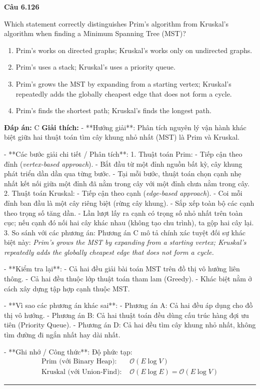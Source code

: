\documentclass[11pt,a4paper]{article}
\newenvironment{question}[1]{%
  \par\vspace{1em}\noindent\textbf{\large Câu #1}\par\vspace{0.4em}
}{%
  \par\vspace{1em}\hrule\vspace{0.6em}
}
\newenvironment{choices}{%
  \begin{enumerate}[label=\textbf{\Alph*.},leftmargin=2.2em,itemsep=2pt,topsep=3pt]
}{%
  \end{enumerate}
}
\newcommand{\choice}{\item}
\begin{document}
\begin{question}{6.126}
Which statement correctly distinguishes Prim's algorithm from Kruskal's algorithm when finding a Minimum Spanning Tree (MST)?
\begin{choices}
\choice Prim's works on directed graphs; Kruskal's works only on undirected graphs.
\choice Prim's uses a stack; Kruskal's uses a priority queue.
\choice Prim's grows the MST by expanding from a starting vertex; Kruskal's repeatedly adds the globally cheapest edge that does not form a cycle.
\choice Prim's finds the shortest path; Kruskal's finds the longest path.
\end{choices}
\textbf{Đáp án:} C
\textbf{Giải thích:} - **Hướng giải**:
Phân tích nguyên lý vận hành khác biệt giữa hai thuật toán tìm cây khung nhỏ nhất (MST) là Prim và Kruskal.


- **Các bước giải chi tiết / Phân tích**:
1. Thuật toán Prim:
   - Tiếp cận theo đỉnh (\textit{vertex-based approach}).
   - Bắt đầu từ một đỉnh nguồn bất kỳ, cây khung phát triển dần dần qua từng bước.
   - Tại mỗi bước, thuật toán chọn cạnh nhẹ nhất kết nối giữa một đỉnh đã nằm trong cây với một đỉnh chưa nằm trong cây.
2. Thuật toán Kruskal:
   - Tiếp cận theo cạnh (\textit{edge-based approach}).
   - Coi mỗi đỉnh ban đầu là một cây riêng biệt (rừng cây khung).
   - Sắp xếp toàn bộ các cạnh theo trọng số tăng dần.
   - Lần lượt lấy ra cạnh có trọng số nhỏ nhất trên toàn cục; nếu cạnh đó nối hai cây khác nhau (không tạo chu trình), ta gộp hai cây lại.
3. So sánh với các phương án: Phương án C mô tả chính xác tuyệt đối sự khác biệt này: \textit{Prim's grows the MST by expanding from a starting vertex; Kruskal's repeatedly adds the globally cheapest edge that does not form a cycle.}


- **Kiểm tra lại**:
- Cả hai đều giải bài toán MST trên đồ thị vô hướng liên thông.
- Cả hai đều thuộc lớp thuật toán tham lam (Greedy).
- Khác biệt nằm ở cách xây dựng tập hợp cạnh thuộc MST.


- **Vì sao các phương án khác sai**:
- Phương án A: Cả hai đều áp dụng cho đồ thị vô hướng.
- Phương án B: Cả hai thuật toán đều dùng cấu trúc hàng đợi ưu tiên (Priority Queue).
- Phương án D: Cả hai đều tìm cây khung nhỏ nhất, không tìm đường đi ngắn nhất hay dài nhất.


- **Ghi nhớ / Công thức**:
Độ phức tạp:
\[\begin{aligned}
\text{Prim (với Binary Heap): } & \mathcal{O}(E \log V) \\
\text{Kruskal (với Union-Find): } & \mathcal{O}(E \log E) = \mathcal{O}(E \log V)
\end{aligned}\]
\end{question}
\end{document}
